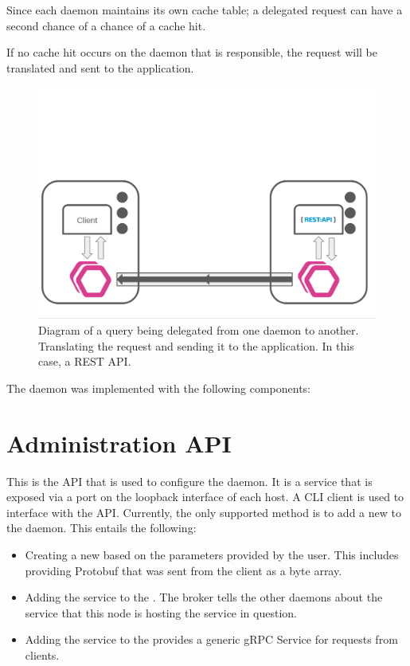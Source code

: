 \documentclass[a4paper,12pt]{report}
\begin{document}
Since each daemon maintains its own cache table; a delegated request can have a second chance of a chance of a cache hit.

If no cache hit occurs on the daemon that is responsible, the request will be translated and sent to the application.

\begin{figure}[hbt!]
    \centering
    \includegraphics[width=\linewidth]{delegate.png}
    \caption{Diagram of a query being delegated from one daemon to another. Translating the request and sending it to the application. In this case, a REST API.}
    \label{fig:admin}
\end{figure}

\newpage

The daemon was implemented with the following components:

\section{Administration API}
\label{sec:api}
This is the API that is used to configure the daemon. It is a  service that is exposed via a port on the loopback interface of each host.
A CLI client is used to interface with the API. Currently, the only supported method is to add a new \textit{} to the daemon.
This entails the following:
\begin{itemize}
    \item Creating a new \textit{} based on the parameters provided by the user.
          This includes providing Protobuf that was sent from the client as a byte array.
    \item Adding the service to the \textit{}. The broker tells the other daemons about the service that this
          node is hosting the service in question.
    \item Adding the service to the \textit{} provides a generic gRPC Service for requests from clients.
\end{itemize}
\end{document}
